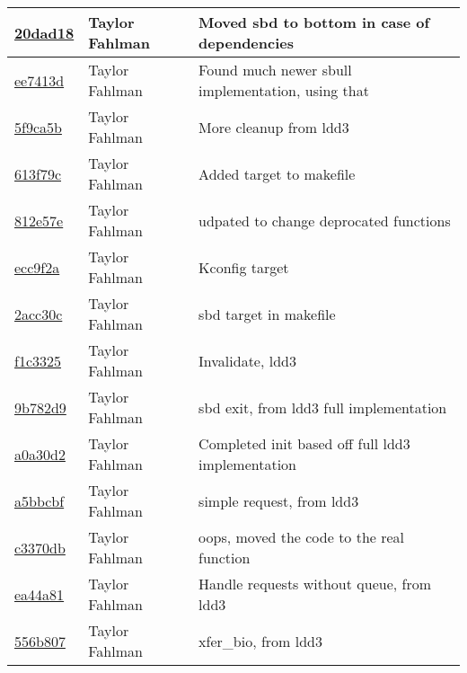 \begin{tabular}{l l l}
\href{git@github.com:fahlmant/cs444/commit/20dad183ac4d3f832c3897a2074652a697506bbc}{20dad18} & Taylor Fahlman & Moved sbd to bottom in case of dependencies\\\hline
\href{git@github.com:fahlmant/cs444/commit/ee7413dc03341028540620375482c5a7e72f729c}{ee7413d} & Taylor Fahlman & Found much newer sbull implementation, using that\\\hline
\href{git@github.com:fahlmant/cs444/commit/5f9ca5b506e502aaa1e4103dbdc7c91220471bd6}{5f9ca5b} & Taylor Fahlman & More cleanup from ldd3\\\hline
\href{git@github.com:fahlmant/cs444/commit/613f79c8756dc8338c7749a141e23f270ec615fd}{613f79c} & Taylor Fahlman & Added target to makefile\\\hline
\href{git@github.com:fahlmant/cs444/commit/812e57e06b0a842babf05c78b43413c10697b97e}{812e57e} & Taylor Fahlman & udpated to change deprocated functions\\\hline
\href{git@github.com:fahlmant/cs444/commit/ecc9f2a339b8b574a762b1329a18bb9cd677318e}{ecc9f2a} & Taylor Fahlman & Kconfig target\\\hline
\href{git@github.com:fahlmant/cs444/commit/2acc30cce09a4737ddc47dae0858626e3452e5d3}{2acc30c} & Taylor Fahlman & sbd target in makefile\\\hline
\href{git@github.com:fahlmant/cs444/commit/f1c33256670dd241e6017234879534c7039a3032}{f1c3325} & Taylor Fahlman & Invalidate, ldd3\\\hline
\href{git@github.com:fahlmant/cs444/commit/9b782d93b8f054a5c1cf1e61b5cf40183f3857e7}{9b782d9} & Taylor Fahlman & sbd exit, from ldd3 full implementation\\\hline
\href{git@github.com:fahlmant/cs444/commit/a0a30d2c9c9fd9f76993f86a59a6195c571db27b}{a0a30d2} & Taylor Fahlman & Completed init based off full ldd3 implementation\\\hline
\href{git@github.com:fahlmant/cs444/commit/a5bbcbfe1f20b45f2902911217caeead7b5230e9}{a5bbcbf} & Taylor Fahlman & simple request, from ldd3\\\hline
\href{git@github.com:fahlmant/cs444/commit/c3370db316fc781f54c9b53345cd596653ce68d3}{c3370db} & Taylor Fahlman & oops, moved the code to the real function\\\hline
\href{git@github.com:fahlmant/cs444/commit/ea44a818a5d009be8ea588c0457ee154adadd8fe}{ea44a81} & Taylor Fahlman & Handle requests without queue, from ldd3\\\hline
\href{git@github.com:fahlmant/cs444/commit/556b807f9df3c2511c99834f90a7db474be95ed6}{556b807} & Taylor Fahlman & xfer_bio, from ldd3\\\hline

\end{tabular}

